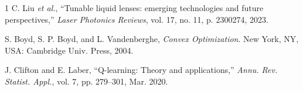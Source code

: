 \documentclass[twocolumn,twoside]{IEEEtran}
\theoremstyle{break}
\begin{document}
\begin{thebibliography}{1}
		C. Liu \textit{et al.}, ``Tunable liquid lenses: emerging
		technologies and future perspectives,'' \textit{Laser Photonics Reviews}, vol. 17,
		no. 11, p. 2300274, 2023.
		
		S. Boyd, S. P. Boyd, and L. Vandenberghe, \textit{Convex Optimization}. New
		York, NY, USA: Cambridge Univ. Press, 2004.
		
		J. Clifton and E. Laber, ``Q-learning: Theory and applications,'' \textit{Annu.
			Rev. Statist. Appl.}, vol. 7, pp. 279–301, Mar. 2020.
		

%	 
	 
	 
\end{thebibliography}
\end{document}
